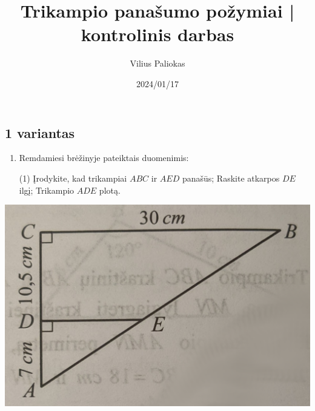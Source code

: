 \documentclass[a4paper]{article}
\title{Trikampio panašumo požymiai | kontrolinis darbas }
\author{Vilius Paliokas}
\date{2024/01/17}
\begin{document}
\thispagestyle{fancy}

\subsection*{1 variantas}

\begin{minipage}{0.5\textwidth}
      \begin{enumerate}
            \setcounter{enumi}{0} %
            \item Remdamiesi brėžinyje pateiktais duomenimis:
                  \begin{tasks}[item-format={\normalfont}, after-item-skip=2mm](1)
                        \task Įrodykite, kad trikampiai $ABC$ ir $AED$ panašūs;
                        \task Raskite atkarpos $DE$ ilgį;
                        \task Trikampio $ADE$ plotą.
                  \end{tasks}
      \end{enumerate}

      \begin{center}
            \includegraphics[scale=0.5]{images/triangle_1.png}
      \end{center}

\end{minipage}
\end{document}
